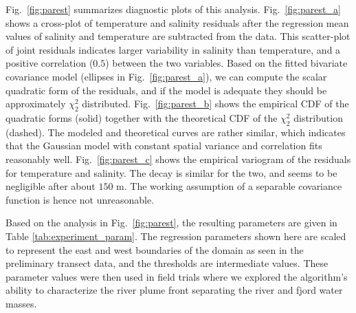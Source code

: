 \documentclass[aoas]{imsart}
\begin{document}
Fig.~\ref{fig:parest} summarizes diagnostic plots of this
analysis. Fig.~\ref{fig:parest_a} shows a cross-plot of temperature
and salinity residuals after the regression mean values of salinity and
temperature are subtracted from the data. This scatter-plot of joint
residuals indicates larger variability in salinity than temperature,
and a positive correlation ($0.5$) between the two variables. Based on
the fitted bivariate covariance model (ellipses in
Fig.~\ref{fig:parest_a}), we can compute the scalar quadratic form of
the residuals, and if the model is adequate they should be approximately $\chi^2_2$ distributed. Fig.~\ref{fig:parest_b} shows
the empirical CDF of the quadratic forms (solid) together with the
theoretical CDF of the $\chi^2_2$ distribution (dashed). The modeled and
theoretical curves are rather similar, which indicates that the Gaussian
model with constant spatial variance and correlation fits reasonably well. Fig.~\ref{fig:parest_c} shows the
empirical variogram of the residuals for temperature and salinity. The decay is similar for the two, and seems to be negligible
after about $150$ m.  The working assumption of a separable covariance
function is hence not unreasonable.

Based on the analysis in Fig.~\ref{fig:parest}, the resulting
parameters are given in Table \ref{tab:experiment_param}. The
regression parameters shown here are scaled to represent the east and
west boundaries of the domain as seen in the preliminary transect
data, and the thresholds are intermediate values. These parameter
values were then used in field trials where we explored the
algorithm's ability to characterize the river plume front separating
the river and fjord water masses.

\end{document}
